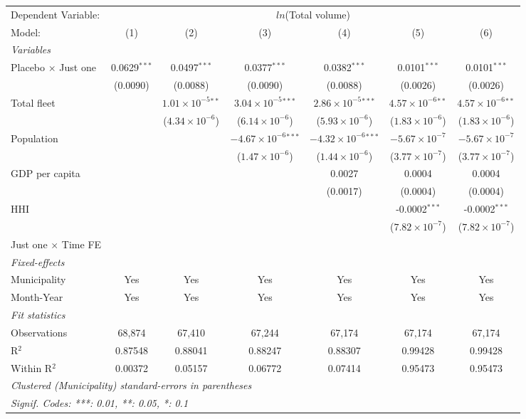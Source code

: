 \documentclass[
]{article}
\begin{document}
\begin{tabular}{lcccccc}
\tabularnewline\midrule\midrule
Dependent Variable:&\multicolumn{6}{c}{$ln$(Total volume)}\\
Model:&(1) & (2) & (3) & (4) & (5) & (6)\\
\midrule \emph{Variables}&   &   &   &   &   &  \\
Placebo $\times $ Just one & 0.0629$^{***}$ & 0.0497$^{***}$ & 0.0377$^{***}$ & 0.0382$^{***}$ & 0.0101$^{***}$ & 0.0101$^{***}$\\
  &(0.0090) & (0.0088) & (0.0090) & (0.0088) & (0.0026) & (0.0026)\\
Total fleet &    & $1.01\times 10^{-5}$$^{**}$ & $3.04\times 10^{-5}$$^{***}$ & $2.86\times 10^{-5}$$^{***}$ & $4.57\times 10^{-6}$$^{**}$ & $4.57\times 10^{-6}$$^{**}$\\
  &   & ($4.34\times 10^{-6}$) & ($6.14\times 10^{-6}$) & ($5.93\times 10^{-6}$) & ($1.83\times 10^{-6}$) & ($1.83\times 10^{-6}$)\\
Population &    &    & $-4.67\times 10^{-6}$$^{***}$ & $-4.32\times 10^{-6}$$^{***}$ & $-5.67\times 10^{-7}$ & $-5.67\times 10^{-7}$\\
  &   &    & ($1.47\times 10^{-6}$) & ($1.44\times 10^{-6}$) & ($3.77\times 10^{-7}$) & ($3.77\times 10^{-7}$)\\
GDP per capita &    &    &    & 0.0027 & 0.0004 & 0.0004\\
  &   &    &    & (0.0017) & (0.0004) & (0.0004)\\
HHI &    &    &    &    & -0.0002$^{***}$ & -0.0002$^{***}$\\
  &   &    &    &    & ($7.82\times 10^{-7}$) & ($7.82\times 10^{-7}$)\\
Just one $\times$ Time FE &  &  &  &  &  & \\
\midrule \emph{Fixed-effects}&   &   &   &   &   &  \\
Municipality & Yes & Yes & Yes & Yes & Yes & Yes\\
Month-Year & Yes & Yes & Yes & Yes & Yes & Yes\\
\midrule \emph{Fit statistics}&  & & & & & \\
Observations & 68,874&67,410&67,244&67,174&67,174&67,174\\
R$^2$ & 0.87548&0.88041&0.88247&0.88307&0.99428&0.99428\\
Within R$^2$ & 0.00372&0.05157&0.06772&0.07414&0.95473&0.95473\\
\midrule\midrule\multicolumn{7}{l}{\emph{Clustered (Municipality) standard-errors in parentheses}}\\
\multicolumn{7}{l}{\emph{Signif. Codes: ***: 0.01, **: 0.05, *: 0.1}}\\
\end{tabular}
\end{document}
